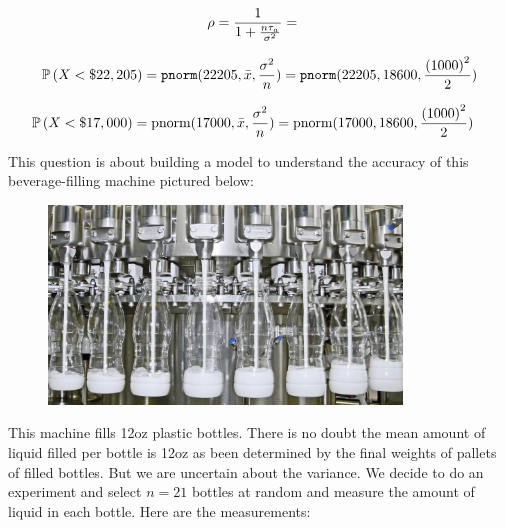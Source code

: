 \documentclass[12pt]{article}
\begin{document}
\begin{enumerate}
\begin{align*}
    \rho &= \frac{1}{1 + \frac{n \tau_a}{\sigma^2}} =  
\end{align*}


\begin{align*}
    \mathbb{P}\left(X < \$22,205\right) = \texttt{pnorm}(22205, \bar{x}, \frac{\sigma^2}{n}) = \texttt{pnorm}(22205, 18600, \frac{\left(1000\right)^2}{2}) 
\end{align*}


\begin{align*}
    \mathbb{P}\left(X < \$17,000\right) &= \text{pnorm}(17000, \bar{x}, \frac{\sigma^2}{n}) = \text{pnorm}(17000, 18600, \frac{\left(1000\right)^2}{2})
\end{align*}

\end{enumerate}

\problem This question is about building a model to understand the accuracy of this beverage-filling machine pictured below:

\begin{figure}[htp]
\centering
\includegraphics[width=3.7in]{milk_filling.jpg}
\end{figure}

This machine fills 12oz plastic bottles. There is no doubt the mean amount of liquid filled per bottle is 12oz as been determined by the final weights of pallets of filled bottles. But we are uncertain about the variance. We decide to do an experiment and select $n = 21$ bottles at random and measure the amount of liquid in each bottle. Here are the measurements:
\end{document}
